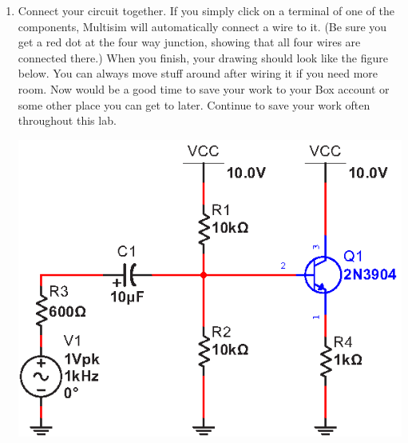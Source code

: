 \begin{enumerate}[wide]
\pagebreak[4]
\item Connect your circuit together.  If you simply click on a terminal of one of the components, Multisim will automatically connect a wire to it.  (Be sure you get a red dot at the four way junction, showing that all four wires are connected there.)  When you finish, your drawing should look like the figure below.  You can always move stuff around after wiring it if you need more room.  Now would be a good time to save your work to your Box account or some other place you can get to later.  Continue to save your work often throughout this lab.
\begin{center}
\includegraphics{multisim/wired.eps}
\end{center}


\end{enumerate}
